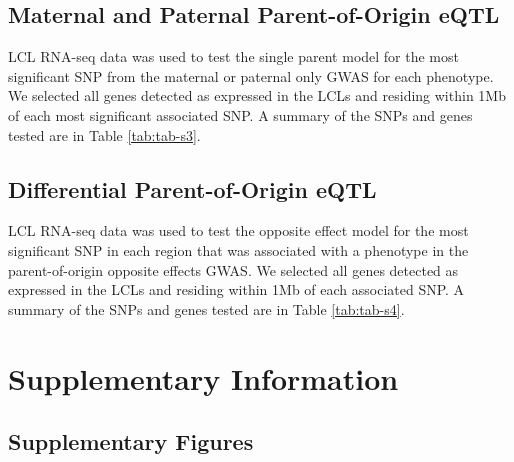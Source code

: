 \subsection{Maternal and Paternal Parent-of-Origin eQTL}\label{Maternal and Paternal Parent-of-Origin Parent-of-Origin eQTL}

LCL RNA-seq data was used to test the single parent model for the most significant SNP from the maternal or paternal only GWAS for each phenotype. We selected all genes detected as expressed in the LCLs and residing within 1Mb of each most significant associated SNP. A summary of the SNPs and genes tested are in Table \ref{tab:tab-s3}.

\subsection{Differential Parent-of-Origin eQTL}\label{Differential Parent-of-Origin eQTL}

LCL RNA-seq data was used to test the opposite effect model for the most significant SNP in each region that was associated with a phenotype in the parent-of-origin opposite effects GWAS. We selected all genes detected as expressed in the LCLs and residing within 1Mb of each associated SNP. A summary of the SNPs and genes tested are in Table \ref{tab:tab-s4}.

\clearpage
\section{Supplementary Information}\label{fig-supplementary-information}

\subsection{Supplementary Figures}\label{fig-supplementary-figures}
\renewcommand\theContinuedFloat{\alph{ContinuedFloat}}
 
